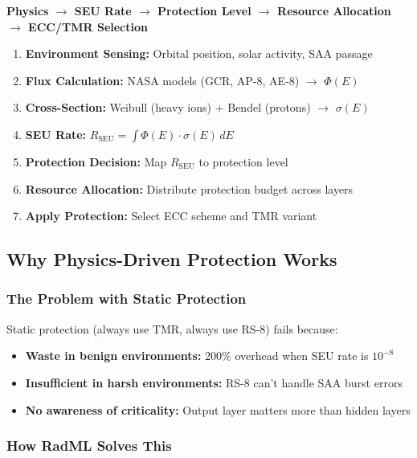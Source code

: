 \documentclass[11pt,a4paper]{article}
\begin{document}
\begin{tcolorbox}[colback=green!5!white,colframe=green!50!black,title=End-to-End Protection Flow]
\textbf{Physics $\to$ SEU Rate $\to$ Protection Level $\to$ Resource Allocation $\to$ ECC/TMR Selection}

\begin{enumerate}
    \item \textbf{Environment Sensing:} Orbital position, solar activity, SAA passage
    \item \textbf{Flux Calculation:} NASA models (GCR, AP-8, AE-8) $\to$ $\Phi(E)$
    \item \textbf{Cross-Section:} Weibull (heavy ions) + Bendel (protons) $\to$ $\sigma(E)$
    \item \textbf{SEU Rate:} $R_{\text{SEU}} = \int \Phi(E) \cdot \sigma(E) \, dE$
    \item \textbf{Protection Decision:} Map $R_{\text{SEU}}$ to protection level
    \item \textbf{Resource Allocation:} Distribute protection budget across layers
    \item \textbf{Apply Protection:} Select ECC scheme and TMR variant
\end{enumerate}
\end{tcolorbox}

\subsection{Why Physics-Driven Protection Works}

\subsubsection{The Problem with Static Protection}

Static protection (always use TMR, always use RS-8) fails because:
\begin{itemize}
    \item \textbf{Waste in benign environments:} 200\% overhead when SEU rate is $10^{-8}$
    \item \textbf{Insufficient in harsh environments:} RS-8 can't handle SAA burst errors
    \item \textbf{No awareness of criticality:} Output layer matters more than hidden layers
\end{itemize}

\subsubsection{How RadML Solves This}
\end{document}
